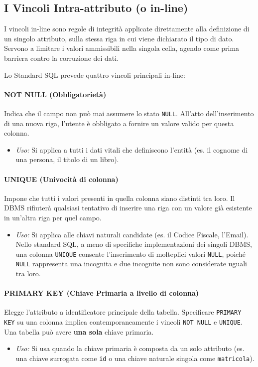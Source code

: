 \subsection{I Vincoli Intra-attributo (o in-line)}

I vincoli in-line sono regole di integrità applicate direttamente alla definizione di un singolo attributo, sulla stessa riga in cui viene dichiarato il tipo di dato. Servono a limitare i valori ammissibili nella singola cella, agendo come prima barriera contro la corruzione dei dati.

Lo Standard SQL prevede quattro vincoli principali in-line:

\paragraph{NOT NULL (Obbligatorietà)}
Indica che il campo non può mai assumere lo stato \texttt{NULL}. All'atto dell'inserimento di una nuova riga, l'utente è obbligato a fornire un valore valido per questa colonna.
\begin{itemize}
    \item \textit{Uso:} Si applica a tutti i dati vitali che definiscono l'entità (es. il cognome di una persona, il titolo di un libro).
\end{itemize}

\paragraph{UNIQUE (Univocità di colonna)}
Impone che tutti i valori presenti in quella colonna siano distinti tra loro. Il DBMS rifiuterà qualsiasi tentativo di inserire una riga con un valore già esistente in un'altra riga per quel campo.
\begin{itemize}
    \item \textit{Uso:} Si applica alle chiavi naturali candidate (es. il Codice Fiscale, l'Email). Nello standard SQL, a meno di specifiche implementazioni dei singoli DBMS, una colonna \texttt{UNIQUE} consente l'inserimento di molteplici valori \texttt{NULL}, poiché \texttt{NULL} rappresenta una incognita e due incognite non sono considerate uguali tra loro.
\end{itemize}

\paragraph{PRIMARY KEY (Chiave Primaria a livello di colonna)}
Elegge l'attributo a identificatore principale della tabella. Specificare \texttt{PRIMARY KEY} su una colonna implica contemporaneamente i vincoli \texttt{NOT NULL} e \texttt{UNIQUE}. Una tabella può avere \textbf{una sola} chiave primaria.
\begin{itemize}
    \item \textit{Uso:} Si usa quando la chiave primaria è composta da un solo attributo (es. una chiave surrogata come \texttt{id} o una chiave naturale singola come \texttt{matricola}).
\end{itemize}

